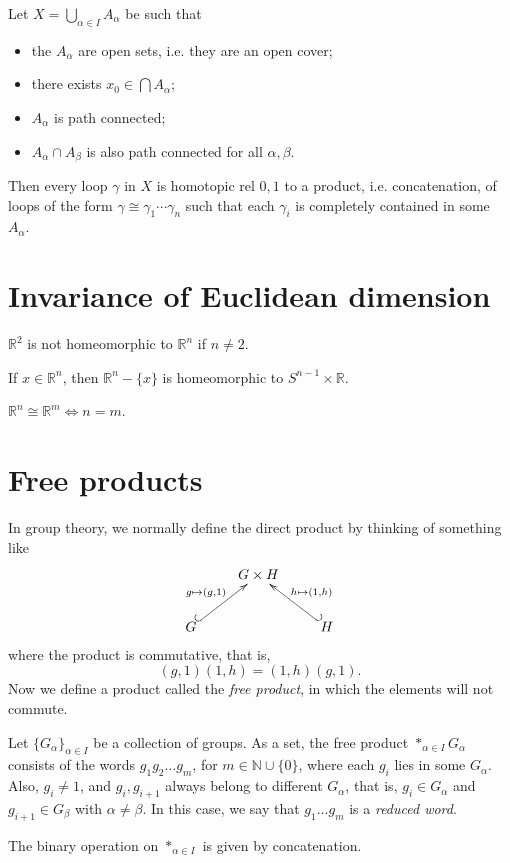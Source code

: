 \begin{lemma}
\label{lemma-loop-factorization-open-cover}
\label{lema:homotopia}
Let $X=\bigcup_{\alpha\in I} A_\alpha$ be
such that
\begin{itemize}
\item the $A_\alpha$ are open sets, i.e. they
are an open
cover;
\item there exists $x_0\in\bigcap A_\alpha$;
\item $A_\alpha$ is path connected;
\item $A_\alpha\cap A_\beta$ is also path
connected for all
$\alpha,\beta$.
\end{itemize}
Then every loop $\gamma$ in $X$ is homotopic
rel $0,1$ to a
product, i.e. concatenation, of loops of the
form
$\gamma\cong\gamma_1\cdots\gamma_n$ such that
each
$\gamma_i$ is completely contained in some
$A_\alpha$.
\end{lemma}
\section{Invariance of Euclidean dimension}
\label{section-invariance-dimension}

\begin{theorem}
$\mathbb{R}^2$ is not homeomorphic to
$\mathbb{R}^n$ if $n\neq2$.
\end{theorem}

\begin{remark}
If $x\in\mathbb{R}^n$, then
$\mathbb{R}^n-\{x\}$ is homeomorphic to
$S^{n-1}\times\mathbb{R}$.
\end{remark}

\begin{theorem}
$\mathbb{R}^n\cong\mathbb{R}^m\iff n=m$.
\end{theorem}
\section{Free products}
\label{section-free-products}

In group theory, we normally define the
direct product by
thinking of something like
$$
\xymatrix{
  & G\times H \\
G \ar@{^{(}->}[ur]^{g\mapsto(g,1)}
  && H \ar@{_{(}->}[ul]_{h\mapsto(1,h)}
}
$$
where the product is commutative, that is,
$$
(g,1)(1,h)=(1,h)(g,1).
$$
Now we define a product called the \emph{free
product}, in
which the elements will not commute.

\begin{definition}
Let $\{G_\alpha\}_{\alpha\in I}$ be a
collection of groups.
As a set, the free product $\ast_{\alpha\in
I}G_\alpha$
consists of the words $g_1g_2\ldots g_m$, for
$m\in\mathbb{N}\cup\{0\}$, where each $g_i$
lies in some
$G_\alpha$. Also, $g_i\neq1$, and
$g_i,g_{i+1}$ always
belong to different $G_\alpha$, that is,
$g_i\in G_\alpha$
and $g_{i+1}\in G_\beta$ with
$\alpha\neq\beta$. In this
case, we say that $g_1\ldots g_m$ is a
\emph{reduced word}.

The binary operation on $\ast_{\alpha\in I}$
is given by
concatenation.
\end{definition}

